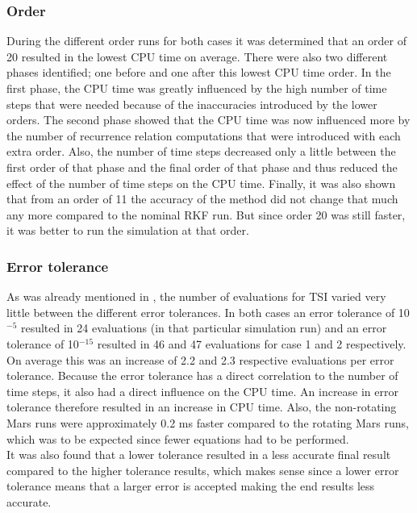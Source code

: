 \subsubsection{Order}
During the different order runs for both cases it was determined that an order of 20 resulted in the lowest CPU time on average. There were also two different phases identified; one before and one after this lowest CPU time order. In the first phase, the CPU time was greatly influenced by the high number of time steps that were needed because of the inaccuracies introduced by the lower orders. The second phase showed that the CPU time was now influenced more by the number of recurrence relation computations that were introduced with each extra order. Also, the number of time steps decreased only a little between the first order of that phase and the final order of that phase and thus reduced the effect of the number of time steps on the CPU time. Finally, it was also shown that from an order of 11 the accuracy of the method did not change that much any more compared to the nominal \ac{RKF} run. But since order 20 was still faster, it was better to run the simulation at that order.

\subsubsection{Error tolerance}
As was already mentioned in , the number of evaluations for \ac{TSI} varied very little between the different error tolerances. In both cases an error tolerance of 10$^{-5}$ resulted in 24 evaluations (in that particular simulation run) and an error tolerance of 10$^{-15}$ resulted in 46 and 47 evaluations for case 1 and 2 respectively. On average this was an increase of 2.2 and 2.3 respective evaluations per error tolerance. Because the error tolerance has a direct correlation to the number of time steps, it also had a direct influence on the CPU time. An increase in error tolerance therefore resulted in an increase in CPU time. Also, the non-rotating Mars runs were approximately 0.2 ms faster compared to the rotating Mars runs, which was to be expected since fewer equations had to be performed. \\
It was also found that a lower tolerance resulted in a less accurate final result compared to the higher tolerance results, which makes sense since a lower error tolerance means that a larger error is accepted making the end results less accurate.



